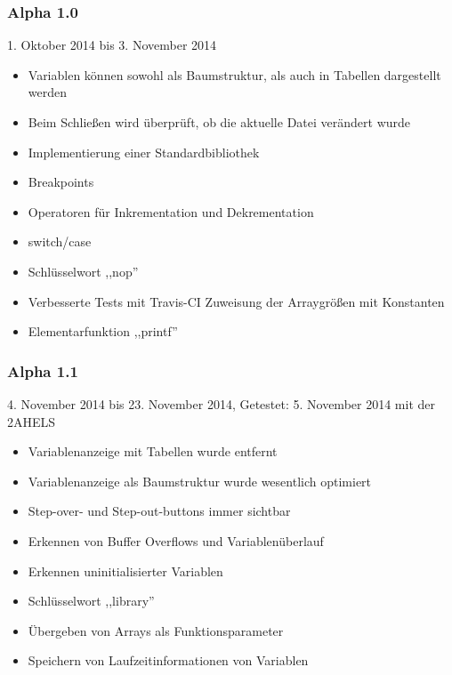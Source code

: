 \subsubsection*{Alpha 1.0}
1. Oktober 2014 bis 3. November 2014
\begin{itemize}
\item Variablen können sowohl als Baumstruktur, als auch in Tabellen dargestellt werden
\item Beim Schließen wird überprüft, ob die aktuelle Datei verändert wurde
\item Implementierung einer Standardbibliothek
\item Breakpoints
\item Operatoren für Inkrementation und Dekrementation
\item switch/case
\item Schlüsselwort ,,nop''
\item Verbesserte Tests mit Travis-CI
Zuweisung der Arraygrößen mit Konstanten
\item Elementarfunktion ,,printf''
\end{itemize}

\subsubsection*{Alpha 1.1}
4. November 2014 bis 23. November 2014,\newline
Getestet: 5. November 2014 mit der 2AHELS
\begin{itemize}
\item Variablenanzeige mit Tabellen wurde entfernt
\item Variablenanzeige als Baumstruktur wurde wesentlich optimiert
\item Step-over- und Step-out-buttons immer sichtbar
\item Erkennen von Buffer Overflows und Variablenüberlauf
\item Erkennen uninitialisierter Variablen
\item Schlüsselwort ,,library''
\item Übergeben von Arrays als Funktionsparameter
\item Speichern von Laufzeitinformationen von Variablen
\end{itemize}


